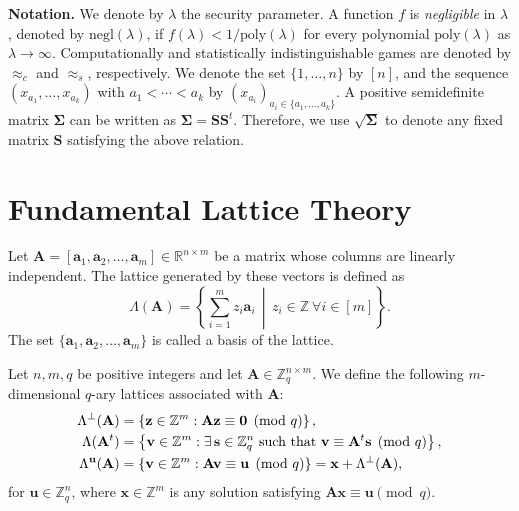% 

\textbf{Notation.}
We denote by $\lambda$ the security parameter.
A function $f$ is \emph{negligible} in $\lambda$, denoted by $\mathrm{negl}(\lambda)$, if
$f(\lambda) < 1/\mathrm{poly}(\lambda)$ for every polynomial $\mathrm{poly}(\lambda)$ as $\lambda \to \infty$.
Computationally and statistically indistinguishable games are denoted by $\approx_c$ and $\approx_s$, respectively.
We denote the set $\{1,\dots,n\}$ by $[n]$, and the sequence $(x_{a_1}, \dots, x_{a_k})$ with
$a_1 < \cdots < a_k$ by $(x_{a_i})_{a_i \in \{a_1,\dots,a_k\}}$.
A positive semidefinite matrix $\mathbf{\Sigma}$ can be written as
$\mathbf{\Sigma} = \mathbf{S}\mathbf{S}^t$.
Therefore, we use $\sqrt{\mathbf{\Sigma}}$ to denote any fixed matrix $\mathbf{S}$ satisfying the above relation.

\section{Fundamental Lattice Theory}

\begin{definition}
Let $\mathbf{A} = [\mathbf{a}_1,\mathbf{a}_2,\dots,\mathbf{a}_m] \in \mathbb{R}^{n\times m}$ be a matrix whose columns are linearly independent.
The lattice generated by these vectors is defined as
\[
\Lambda(\mathbf{A})
=
\left\{
\sum_{i=1}^{m} z_i \mathbf{a}_i \,\middle|\, z_i \in \mathbb{Z}\ \forall i \in [m]
\right\}.
\]
The set $\{\mathbf{a}_1,\mathbf{a}_2,\dots,\mathbf{a}_m\}$ is called a basis of the lattice.
\end{definition}

\begin{definition}
Let $n,m,q$ be positive integers and let $\mathbf{A}\in\mathbb{Z}_q^{n\times m}$.
We define the following $m$-dimensional $q$-ary lattices associated with $\mathbf{A}$:
\[
\setlength{\jot}{2pt}
\begin{aligned}
\Lambda^\perp(\mathbf{A})
&=
\left\{
\mathbf{z}\in\mathbb{Z}^m : \mathbf{A}\mathbf{z}\equiv \mathbf{0}\pmod q
\right\},\\
\Lambda(\mathbf{A}^t)
&=
\left\{
\mathbf{v}\in\mathbb{Z}^m : \exists\,\mathbf{s}\in\mathbb{Z}_q^n \text{ such that } \mathbf{v}\equiv \mathbf{A}^t\mathbf{s}\pmod q
\right\},\\
\Lambda^{\mathbf{u}}(\mathbf{A})
&=
\left\{
\mathbf{v}\in\mathbb{Z}^m : \mathbf{A}\mathbf{v}\equiv \mathbf{u}\pmod q
\right\}
=
\mathbf{x} + \Lambda^\perp(\mathbf{A}),
\end{aligned}
\]
for $\mathbf{u} \in \mathbb{Z}_q^n$, where $\mathbf{x}\in\mathbb{Z}^m$ is any solution satisfying
$\mathbf{A}\mathbf{x}\equiv \mathbf{u}\pmod q$.
\end{definition}

